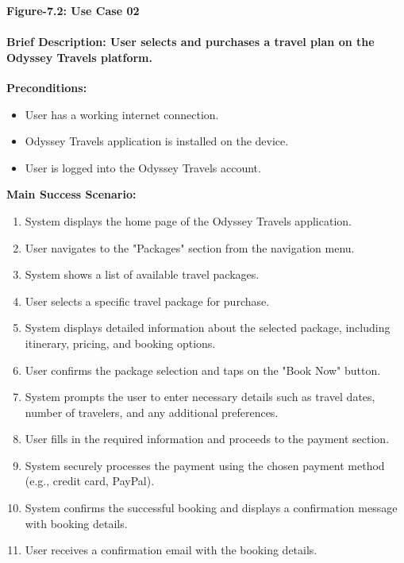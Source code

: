 \documentclass{scrreprt}
\begin{document}
\begin{center}
    \parbox{0.8\textwidth}{ 
        \centering
        \textbf{Figure-7.2: Use Case 02}
    }
\end{center}
\paragraph {\textnormal{Brief Description: 
User selects and purchases a travel plan on the Odyssey Travels platform.\newline
}}
\textbf{Preconditions:}
\begin{itemize}
    \item User has a working internet connection.
    \item Odyssey Travels application is installed on the device.
    \item User is logged into the Odyssey Travels account.
\end{itemize}

\textbf{Main Success Scenario:}
\begin{enumerate}
    \item System displays the home page of the Odyssey Travels application.
    \item User navigates to the "Packages" section from the navigation menu.
    \item System shows a list of available travel packages.
    \item User selects a specific travel package for purchase.
    \item System displays detailed information about the selected package, including itinerary, pricing, and booking options.
    \item User confirms the package selection and taps on the "Book Now" button.
    \item System prompts the user to enter necessary details such as travel dates, number of travelers, and any additional preferences.
    \item User fills in the required information and proceeds to the payment section.
    \item System securely processes the payment using the chosen payment method (e.g., credit card, PayPal).
    \item System confirms the successful booking and displays a confirmation message with booking details.
    \item User receives a confirmation email with the booking details.
\end{enumerate}
\end{document}
